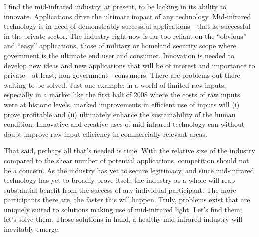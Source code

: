I find the mid-infrared industry, at present, to be lacking in its ability to innovate.  Applications drive the ultimate impact of any technology.  Mid-infrared technology is in need of demonstrably successful applications---that is, successful in the private sector.  The industry right now is far too reliant on the ``obvious'' and ``easy'' applications, those of military or homeland security scope where government is the ultimate end user and consumer.  Innovation is needed to develop new ideas and new applications that will be of interest and importance to private---at least, non-government---consumers.  There are problems out there waiting to be solved.  Just one example: in a world of limited raw inputs, especially in a market like the first half of 2008 where the costs of raw inputs were at historic levels, marked improvements in efficient use of inputs will (i) prove profitable and (ii) ultimately enhance the sustainability of the human condition.  Innovative and creative uses of mid-infrared technology can without doubt improve raw input efficiency in commercially-relevant areas.

\pagebreak[3]

That said, perhaps all that's needed is time.  With the relative size of the industry compared to the shear number of potential applications, competition should not be a concern.  As the industry has yet to secure legitimacy, and since mid-infrared technology has yet to broadly prove itself, the industry as a whole will reap substantial benefit from the success of any individual participant.  The more participants there are, the faster this will happen. Truly, problems exist that are uniquely suited to solutions making use of mid-infrared light.  Let's find them; let's solve them.  Those solutions in hand, a healthy mid-infrared industry will inevitably emerge.












%
%
%
% 